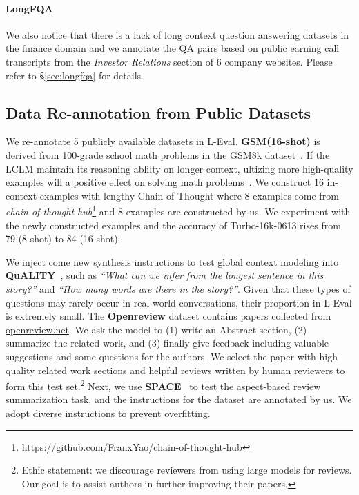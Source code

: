 \vspace{-0.7em}
\paragraph{LongFQA} We also notice that there is a lack of long context question answering datasets in the finance domain and we annotate the QA pairs based on public earning call transcripts from the \textit{Investor Relations} section of 6 company websites.  Please refer to \S\ref{sec:longfqa} for details.

\subsection{Data Re-annotation from Public Datasets}\label{sec:re-anno}
We re-annotate 5 publicly available datasets in L-Eval. 
\textbf{GSM(16-shot)} is derived from 100-grade school math problems in the GSM8k dataset~\citep{cobbe2021training}. If the LCLM maintain its reasoning ablilty on longer context, ultizing more high-quality examples will a positive effect on solving math problems~\citep{li2023incontext}. We construct 16 in-context examples with lengthy Chain-of-Thought where 8 examples come from  \textit{chain-of-thought-hub}\footnote{\url{https://github.com/FranxYao/chain-of-thought-hub}} and 8 examples are constructed by us.  We experiment with the newly constructed examples and the accuracy of Turbo-16k-0613 rises from 79 (8-shot) to 84 (16-shot).  

We inject come new synthesis instructions to test global context modeling into \textbf{QuALITY}~\citep{pang2022quality}, such as \textit{``What can we infer from the longest sentence in this story?''} and \textit{``How many words are there in the story?''}. Given that these types of questions may rarely occur in real-world conversations, their proportion in L-Eval is extremely small. 
The \textbf{Openreview} dataset contains papers collected from \url{openreview.net}. We ask the model to (1) write an Abstract
section, (2) summarize the related work, and (3) finally give feedback including valuable suggestions and 
some questions for the authors. We select the paper with high-quality related work sections and helpful reviews written by human reviewers to form this test set.\footnote{Ethic statement:
we discourage reviewers from using large models for reviews. Our goal is to assist authors in further improving their papers.} Next, we use \textbf{SPACE}~\citep{angelidis-etal-2021-extractive} to test the aspect-based review summarization task, and the instructions for the dataset are annotated by us. We adopt diverse instructions to prevent overfitting.

